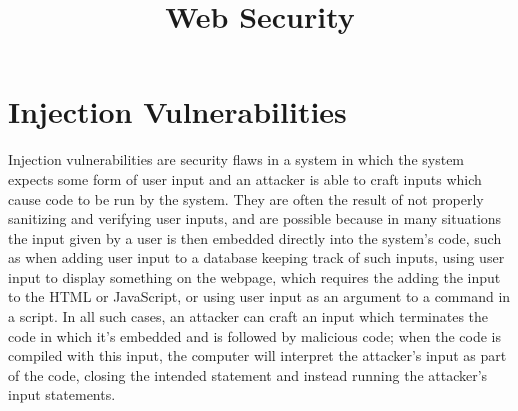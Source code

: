 \documentclass{article}
\begin{document}
\title{Web Security}
\maketitle

\section{Injection Vulnerabilities}
Injection vulnerabilities are security flaws in a system in which the system expects some form of user input and an attacker is able to craft inputs which cause code to be run by the system. They are often the result of not properly sanitizing and verifying user inputs, and are possible because in many situations the input given by a user is then embedded directly into the system's code, such as when adding user input to a database keeping track of such inputs, using user input to display something on the webpage, which requires the adding the input to the HTML or JavaScript, or using user input as an argument to a command in a script. In all such cases, an attacker can craft an input which terminates the code in which it's embedded and is followed by malicious code; when the code is compiled with this input, the computer will interpret the attacker's input as part of the code, closing the intended statement and instead running the attacker's input statements.
\end{document}
